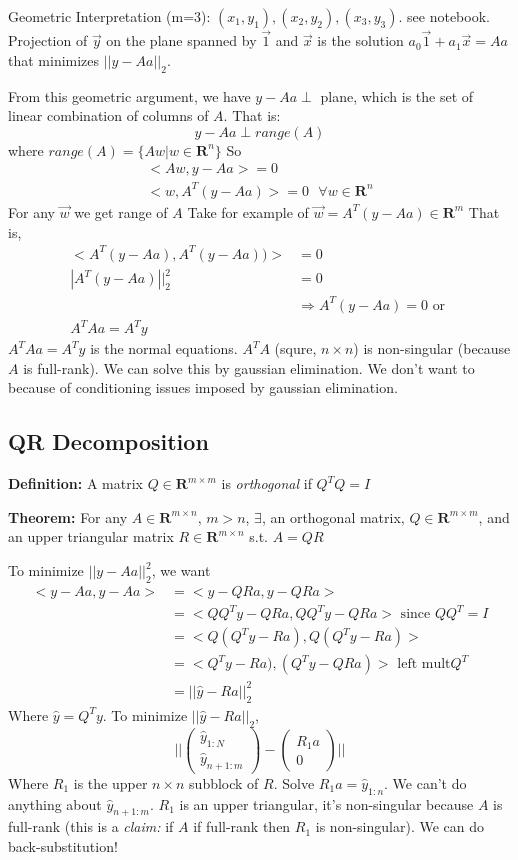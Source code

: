 Geometric Interpretation (m=3): $(x_1, y_1), (x_2, y_2), (x_3,
y_3)$. see notebook. Projection of $\vec y$ on the plane spanned by
$\vec 1$ and $\vec x$ is the solution $a_0\vec 1 + a_1\vec x = Aa$ that
minimizes $||y-Aa||_2$. 

From this geometric argument, we have $y-Aa \perp $ plane, which is
the set of linear combination of columns of $A$. That is:
$$y-Aa \perp range(A)$$ where $range(A)=\{Aw| w\in \mathbf{R}^n\}$
So
\begin{align*}
<Aw, y-Aa> = 0\\
<w, A^T(y-Aa)> = 0 \text{ } \forall w\in \mathbf{R}^n
\end{align*}
For any $\vec w$ we get range of $A$
Take for example of $\vec w=A^T(y-Aa) \in \mathbf{R}^m$ That is, 
\begin{align*}
<A^T(y-Aa), A^T(y-Aa))> &=0\\
|A^T(y-Aa)||^2_2 &= 0\\
&\Rightarrow A^T(y-Aa) = 0 \text{ or }\\
A^TAa = A^Ty
\end{align*}
$A^TAa = A^Ty$ is the normal equations. $A^TA$ (squre, $n\times n$) is
non-singular (because $A$ is full-rank). We can solve this by gaussian elimination.
We don't want to because of conditioning issues imposed by gaussian elimination.

\subsection{QR Decomposition}
\textbf{Definition:} A matrix $Q\in \mathbf{R}^{m\times m}$ is
\emph{orthogonal} if $Q^TQ=I$

\textbf{Theorem:} For any $A\in \mathbf{R}^{m\times n}$, $m>n$, $\exists$,
an orthogonal matrix, $Q\in \mathbf{R}^{m\times m}$, and an upper
triangular matrix $R\in \mathbf{R}^{m\times n}$ s.t. $A=QR$

To minimize $||y-Aa||^2_2$, we want
\begin{align*}
  <y-Aa, y-Aa> &= <y-QRa, y-QRa>\\
&=<QQ^Ty-QRa, QQ^Ty-QRa> \text{ since } QQ^T=I\\
&=<Q(Q^Ty-Ra), Q(Q^Ty-Ra)>\\
&=<Q^Ty-Ra), (Q^Ty-QRa)> \text{ left mult} Q^T\\
&=||\hat y - Ra||^2_2
\end{align*}
Where $\hat y = Q^Ty$. To minimize $||\hat y - Ra||_2$, 
$$||
\begin{pmatrix}
\hat y_{1:N}\\ \hat y_{n+1:m}  
\end{pmatrix} - 
\begin{pmatrix}
R_1a \\ 0
\end{pmatrix}||
$$
Where $R_1$ is the upper $n\times n$ subblock of $R$.
Solve $R_1a = \hat y_{1:n}$. We can't do anything about $\hat
y_{n+1:m}$.
$R_1$ is an upper triangular, it's non-singular because $A$ is
full-rank (this is a \emph{claim:} if $A$ if full-rank then $R_1$ is non-singular). We can
do back-substitution!


